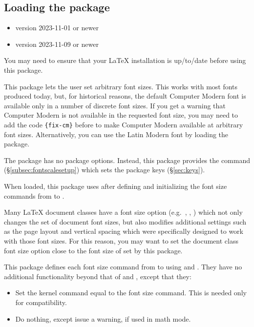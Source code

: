 \documentclass{beery}
\begin{document}
\subsection{Loading the package}
\label{subsec:loading}

\begin{itemize}
  \item \LaTeXe{} version 2023-11-01 or newer
  \item {} version 2023-11-09 or newer
\end{itemize}

You may need to ensure that your \LaTeX{} installation is up\-/to\-/date before using this package.

This package lets the user set arbitrary font sizes.
This works with most fonts produced today, but, for historical reasons, the default Computer Modern font is available only in a number of discrete font sizes.
If you get a warning that Computer Modern is not available in the requested font size, you may need to add the code \allowbreak\verb|{fix-cm}| before  to make Computer Modern available at arbitrary font sizes.
Alternatively, you can use the Latin Modern font by loading the  package.

The  package has no package options.
Instead, this package provides the command  (\S\ref{subsec:fontscalesetup}) which sets the package keys (\S\ref{sec:keys}).

When loaded, this package uses  after defining and initializing the font size commands from  to .

Many \LaTeX{} document classes have a font size option (e.g.\ \Key{10pt}, \Key{11pt}, \Key{12pt}) which not only changes the set of document font sizes, but also modifies additional settings such as the page layout and vertical spacing which were specifically designed to work with those font sizes.
For this reason, you may want to set the document class font size option close to the font size of  set by this package.

\listheading
  {
    This package defines each font size command from  to  using  and .
    They have no additional functionality beyond that of  and , except that they:
  }
\begin{itemize}
  \item
  Set the kernel command  equal to the font size command.
  This is needed only for compatibility.
  \item
  Do nothing, except issue a warning, if used in math mode.
\end{itemize}
\end{document}
